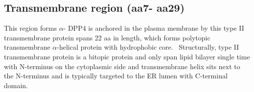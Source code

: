 \subsection{Transmembrane region (aa7- aa29)}

This region forms $\alpha$-
DPP4 is anchored in the plasma membrane by this type II transmembrane protein spans 22 aa in length, which forms polytopic transmembrane $\alpha$-helical protein with hydrophobic core.~\cite{Hong_1990} Structurally, type II transmembrane protein is a bitopic protein and only span lipid bilayer single time with N-terminus on the cytoplasmic side and transmembrane helix sits next to the N-terminus and is typically targeted to the ER lumen with C-terminal domain.  


